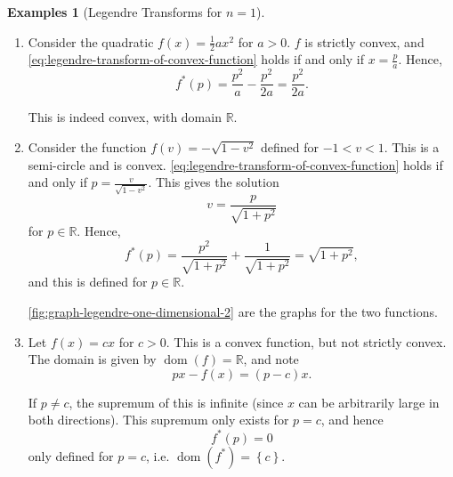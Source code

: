 \documentclass[11pt]{article}
\numberwithin{equation}{section}
\theoremstyle{definition}
\newtheorem{examples}[theorem]{Examples}
\theoremstyle{remark}
\newcommand{\pqty}[1]{\left(#1\right)}
\newcommand{\Bqty}[1]{\left\{#1\right\}}
\newcommand{\flatfrac}[2]{\frac{#1}{#2}}
\newcommand{\RR}{\mathbb{R}}
\newcommand{\legendre}[1]{{#1}^{*}}
\DeclareMathOperator{\dom}{dom}
\begin{document}
\begin{examples}[Legendre Transforms for \(n = 1\)]\label{variation-unit-0022}
    \label{ex:legendre-one-dimensional}%
    \begin{enumerate}
        \item Consider the quadratic \(f\pqty{x} = \frac{1}{2} a x^2\) for \(a > 0\). \(f\) is strictly convex, and \autoref{eq:legendre-transform-of-convex-function} holds if and only if \(x = \flatfrac{p}{a}\). Hence,
        \[
            \legendre{f} \pqty{p} = \frac{p^2}{a} - \frac{p^2}{2a} = \frac{p^2}{2a}.
        \]
        
        This is indeed convex, with domain \(\RR\).

        \item Consider the function \(f\pqty{v} = - \sqrt{1 - v^2}\) defined for \(-1 < v < 1\). This is a semi-circle and is convex. \autoref{eq:legendre-transform-of-convex-function} holds if and only if \(p = \flatfrac{v}{\sqrt{1 - v^2}}\). This gives the solution
        \[
            v = \frac{p}{\sqrt{1 + p^2}}
        \]
        for \(p \in \RR\). Hence,
        \[
            \legendre{f} \pqty{p} = \frac{p^2}{\sqrt{1 + p^2}} + \frac{1}{\sqrt{1 + p^2}} = \sqrt{1 + p^2},
        \]
        and this is defined for \(p \in \RR\).

        \autoref{fig:graph-legendre-one-dimensional-2} are the graphs for the two functions.

        \item Let \(f\pqty{x} = cx\) for \(c > 0\). This is a convex function, but not strictly convex. The domain is given by \(\dom\pqty{f} = \RR\), and note
        \[
            px - f\pqty{x} = \pqty{p - c} x.
        \]

        If \(p \neq c\), the supremum of this is infinite (since \(x\) can be arbitrarily large in both directions). This supremum only exists for \(p = c\), and hence
        \[
            \legendre{f}\pqty{p} = 0
        \]
        only defined for \(p = c\), i.e. \(\dom \pqty{\legendre{f}} = \Bqty{c}\).
    \end{enumerate}
\end{examples}
\end{document}
